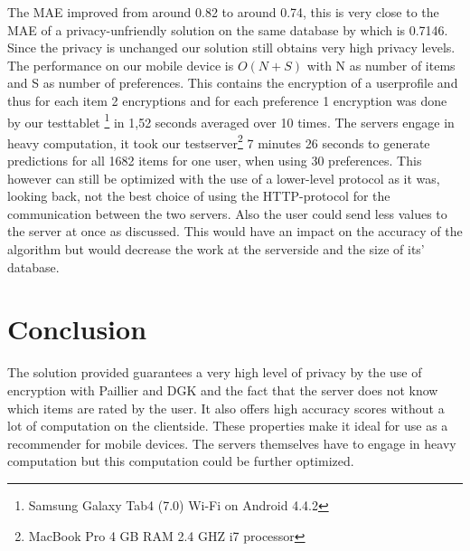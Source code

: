 \documentclass[twocolumn]{phdsymp} %
\begin{document}
The MAE improved from around 0.82 to around 0.74, this is very close to the MAE of a privacy-unfriendly solution on the same database by \cite{rand} which is 0.7146. Since the privacy is unchanged our solution still obtains very high privacy levels. The performance on our mobile device is $O(N+S)$ with N as number of items and S as number of preferences. This contains the encryption of a userprofile and thus for each item 2 encryptions and for each preference 1 encryption was done by our testtablet \footnote{Samsung Galaxy Tab4 (7.0) Wi-Fi on Android 4.4.2} in 1,52 seconds averaged over 10 times. The servers engage in heavy computation, it took our testserver\footnote{MacBook Pro 4 GB RAM 2.4 GHZ i7 processor} 7 minutes 26 seconds to generate predictions for all 1682 items for one user, when using 30 preferences. This however can still be optimized with the use of a lower-level protocol as it was, looking back, not the best choice of using the HTTP-protocol for the communication between the two servers. Also the user could send less values to the server at once as discussed. This would have an impact on the accuracy of the algorithm but would decrease the work at the serverside and the size of its' database.

 
\section{Conclusion}

The solution provided guarantees a very high level of privacy by the use of encryption with Paillier and DGK and the fact that the server does not know which items are rated by the user. It also offers high accuracy scores without a lot of computation on the clientside. These properties make it ideal for use as a recommender for mobile devices. The servers themselves have to engage in heavy computation but this computation could be further optimized.








\nocite{*}

\end{document}
